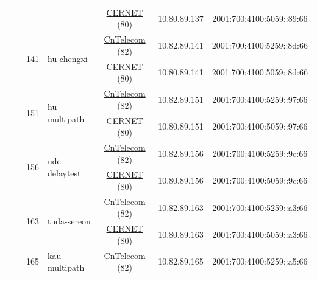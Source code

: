 \begin{small}
\begin{center}
\begin{longtable}{|c|c|c|c|c|c|c|c|}
  &  &  &  & \multicolumn{2}{|c|}{\tiny{\href{http://www.cernet.edu.cn}{CERNET} (80)}} & \tiny{10.80.89.137} & \tiny{2001:700:4100:5059::89:66} \\* \cline{3-3}\cline{4-4}\cline{5-5}\cline{6-6}\cline{7-7}\cline{8-8}
  &  & \multirow{2}{*}{\tiny{141}} & \multicolumn{1}{|l|}{\multirow{2}{*}{\tiny{hu-chengxi}}} & \multicolumn{2}{|c|}{\tiny{\href{http://www.chinatelecom.com.cn}{CnTelecom} (82)}} & \tiny{10.82.89.141} & \tiny{2001:700:4100:5259::8d:66} \\* \cline{5-5}\cline{6-6}\cline{7-7}\cline{8-8}
  &  &  &  & \multicolumn{2}{|c|}{\tiny{\href{http://www.cernet.edu.cn}{CERNET} (80)}} & \tiny{10.80.89.141} & \tiny{2001:700:4100:5059::8d:66} \\* \cline{3-3}\cline{4-4}\cline{5-5}\cline{6-6}\cline{7-7}\cline{8-8}
  &  & \multirow{2}{*}{\tiny{151}} & \multicolumn{1}{|l|}{\multirow{2}{*}{\tiny{hu-multipath}}} & \multicolumn{2}{|c|}{\tiny{\href{http://www.chinatelecom.com.cn}{CnTelecom} (82)}} & \tiny{10.82.89.151} & \tiny{2001:700:4100:5259::97:66} \\* \cline{5-5}\cline{6-6}\cline{7-7}\cline{8-8}
  &  &  &  & \multicolumn{2}{|c|}{\tiny{\href{http://www.cernet.edu.cn}{CERNET} (80)}} & \tiny{10.80.89.151} & \tiny{2001:700:4100:5059::97:66} \\* \cline{3-3}\cline{4-4}\cline{5-5}\cline{6-6}\cline{7-7}\cline{8-8}
  &  & \multirow{2}{*}{\tiny{156}} & \multicolumn{1}{|l|}{\multirow{2}{*}{\tiny{ude-delaytest}}} & \multicolumn{2}{|c|}{\tiny{\href{http://www.chinatelecom.com.cn}{CnTelecom} (82)}} & \tiny{10.82.89.156} & \tiny{2001:700:4100:5259::9c:66} \\* \cline{5-5}\cline{6-6}\cline{7-7}\cline{8-8}
  &  &  &  & \multicolumn{2}{|c|}{\tiny{\href{http://www.cernet.edu.cn}{CERNET} (80)}} & \tiny{10.80.89.156} & \tiny{2001:700:4100:5059::9c:66} \\* \cline{3-3}\cline{4-4}\cline{5-5}\cline{6-6}\cline{7-7}\cline{8-8}
  &  & \multirow{2}{*}{\tiny{163}} & \multicolumn{1}{|l|}{\multirow{2}{*}{\tiny{tuda-sereon}}} & \multicolumn{2}{|c|}{\tiny{\href{http://www.chinatelecom.com.cn}{CnTelecom} (82)}} & \tiny{10.82.89.163} & \tiny{2001:700:4100:5259::a3:66} \\* \cline{5-5}\cline{6-6}\cline{7-7}\cline{8-8}
  &  &  &  & \multicolumn{2}{|c|}{\tiny{\href{http://www.cernet.edu.cn}{CERNET} (80)}} & \tiny{10.80.89.163} & \tiny{2001:700:4100:5059::a3:66} \\* \cline{3-3}\cline{4-4}\cline{5-5}\cline{6-6}\cline{7-7}\cline{8-8}
  &  & \multirow{2}{*}{\tiny{165}} & \multicolumn{1}{|l|}{\multirow{2}{*}{\tiny{kau-multipath}}} & \multicolumn{2}{|c|}{\tiny{\href{http://www.chinatelecom.com.cn}{CnTelecom} (82)}} & \tiny{10.82.89.165} & \tiny{2001:700:4100:5259::a5:66} \\* \cline{5-5}\cline{6-6}\cline{7-7}\cline{8-8}

\end{longtable}
\end{center}
\end{small}
